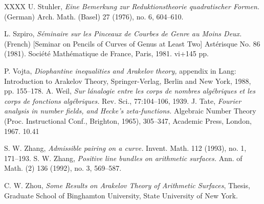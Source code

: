 \documentclass[]{amsart}
\theoremstyle{plain}
\theoremstyle{remark} \newtheorem{remark}[thm]{Remark}
\theoremstyle{remark} \newtheorem{exercise}{Exercise}
\theoremstyle{remark} \newtheorem{example}{Example}
\numberwithin{equation}{section}
\begin{document}
\begin{thebibliography}{XXXX}
U. Stuhler, {\em
Eine Bemerkung zur Reduktionstheorie quadratischer Formen.} (German)
Arch. Math. (Basel) 27 (1976), no. 6, 604--610.

L. Szpiro, {\em S\'{e}minaire sur les Pinceaux de Courbes de Genre au Moins Deux.} (French) [Seminar on Pencils of Curves of Genus at Least Two] Astérisque No. 86 (1981). Société Mathématique de France, Paris, 1981. vi+145 pp.

P. Vojta, {\em Diophantine inequalities and Arakelov theory,} appendix in Lang: Introduction to Arakelov Theory, Springer-Verlag, Berlin and New York, 1988, pp. 155--178.
A. Weil, {\em Sur l\'analogie entre les corps de nombres alg\'{e}briques et les corps de fonctions alg\'{e}briques.} Rev. Sci.,
77:104--106, 1939.
J. Tate, {\em Fourier analysis in number fields, and Hecke's zeta-functions.} Algebraic Number Theory (Proc. Instructional Conf., Brighton, 1965), 305--347, Academic Press, London, 1967. 10.41


S. W. Zhang, {\em Admissible pairing on a curve.}
Invent. Math. 112 (1993), no. 1, 171--193.
S. W. Zhang, {\em Positive line bundles on arithmetic surfaces.}
Ann. of Math. (2) 136 (1992), no. 3, 569--587.


C. W. Zhou, {\em Some Results on Arakelov Theory of Arithmetic Surfaces}, Thesis, Graduate School of
Binghamton University, State University of New York.


\end{thebibliography} 
\end{document}

